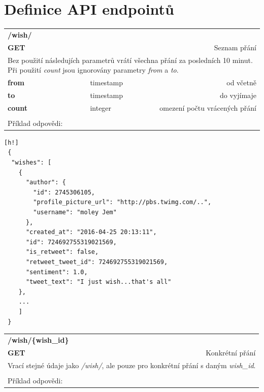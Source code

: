 \documentclass[thesis=B,czech]{FITthesis}[2012/06/26]
\begin{document}
\chapter{Definice API endpointů}
\label{appendix-api}
\begin{table}[h]
\begin{tabular}{llllr}
\rowcolor[HTML]{EFEFEF}
\large \textbf{/wish/}        &         &                 &        & \multicolumn{1}{l}{}                \\
\rowcolor[HTML]{EFEFEF}
\textbf{GET}          &         &                 &        & Seznam přání                        \\
\multicolumn{5}{l}{\parbox[t]{12.8cm}{Bez použití následujích parametrů vrátí všechna přání za posledních 10 minut. Při použití \textit{count} jsou ignorovány parametry  \textit{from} a \textit{to}.}  } \\
\textbf{from}         &         & timestamp       &        & od včetně                           \\
\textbf{to}           &         & timestamp       &        & do vyjímaje                         \\
\textbf{count}        &         & integer         &        & omezení počtu vrácených přání      \\
 & & & & \\
 Příklad odpovědi:
\end{tabular}
\end{table}
\begin{lstlisting}[nolol=true][h!]
 {
  "wishes": [
    {
      "author": {
        "id": 2745306105,
        "profile_picture_url": "http://pbs.twimg.com/..",
        "username": "moley Jem"
      },
      "created_at": "2016-04-25 20:13:11",
      "id": 724692755319021569,
      "is_retweet": false,
      "retweet_tweet_id": 724692755319021569,
      "sentiment": 1.0,
      "tweet_text": "I just wish...that's all"
    },
    ...
    ]
 }
\end{lstlisting}


\begin{table}[h]
\begin{tabular}{llllr}
\rowcolor[HTML]{EFEFEF}
\large \textbf{/wish/\{wish\_id\}}        &         &                 &        & \multicolumn{1}{l}{}                \\
\rowcolor[HTML]{EFEFEF}
\textbf{GET}          &         &                 &        & Konkrétní přání                        \\
\multicolumn{5}{l}{\parbox[t]{12.8cm}{Vrací stejné údaje jako \textit{/wish/}, ale pouze pro konkrétní přání s daným \textit{wish\_id}.}  } \\  
 & & & & \\
 Příklad odpovědi:
\end{tabular}
\end{table}
 
\end{document}
